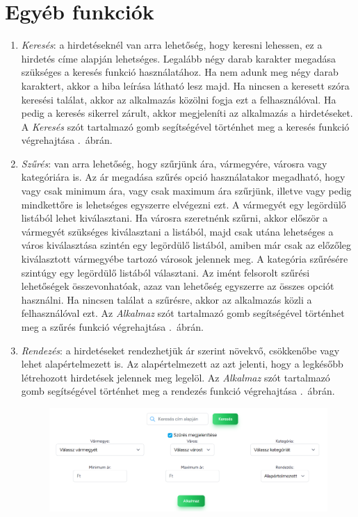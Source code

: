 \documentclass[]{thesis-ekf}
\theoremstyle{definition}
\theoremstyle{remark}
\begin{document}
	\section{Egyéb funkciók}\label{egyeb-funkciok}
		\begin{enumerate}
			\item \emph{Keresés}: a hirdetéseknél van arra lehetőség, hogy keresni lehessen, ez a hirdetés címe alapján lehetséges. Legalább négy darab karakter megadása szükséges a keresés funkció használatához. Ha nem adunk meg négy darab karaktert, akkor a hiba leírása látható lesz majd. Ha nincsen a keresett szóra keresési találat, akkor az alkalmazás közölni fogja ezt a felhasználóval. Ha pedig a keresés sikerrel zárult, akkor megjeleníti az alkalmazás a hirdetéseket. A \emph{Keresés} szót tartalmazó gomb segítségével történhet meg a keresés funkció végrehajtása .~ábrán.
			\item \emph{Szűrés}: van arra lehetőség, hogy szűrjünk ára, vármegyére, városra vagy kategóriára is. Az ár megadása szűrés opció használatakor megadható, hogy vagy csak minimum ára, vagy csak maximum ára szűrjünk, illetve vagy pedig mindkettőre is lehetséges egyszerre elvégezni ezt. A vármegyét egy legördülő listából lehet kiválasztani. Ha városra szeretnénk szűrni, akkor először a vármegyét szükséges kiválasztani a listából, majd csak utána lehetséges a város kiválasztása szintén egy legördülő listából, amiben már csak az előzőleg kiválasztott vármegyébe tartozó városok jelennek meg. A kategória szűrésére szintúgy egy legördülő listából választani. Az imént felsorolt szűrési lehetőségek összevonhatóak, azaz van lehetőség egyszerre az összes opciót használni. Ha nincsen találat a szűrésre, akkor az alkalmazás közli a felhasználóval ezt. Az \emph{Alkalmaz} szót tartalmazó gomb segítségével történhet meg a szűrés funkció végrehajtása .~ábrán.
			\item \emph{Rendezés}: a hirdetéseket rendezhetjük ár szerint növekvő, csökkenőbe vagy lehet alapértelmezett is. Az alapértelmezett az azt jelenti, hogy a legkésőbb létrehozott hirdetések jelennek meg legelöl. Az \emph{Alkalmaz} szót tartalmazó gomb segítségével történhet meg a rendezés funkció végrehajtása .~ábrán.
				\begin{figure}[ht!]
					\centering
					\includegraphics[width=13cm]{./felhasznaloi/kereses-szures}

\end{figure}
\end{enumerate}
\end{document}
